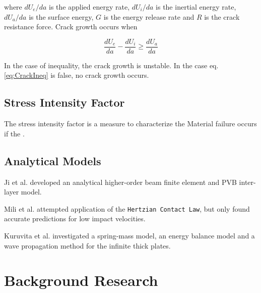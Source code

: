 \documentclass[format=acmsmall, 12pt, screen=true, review=false]{acmart}
\begin{document}
where $dU_e/da$ is the applied energy rate, $dU_i/da$ is the inertial energy rate, $dU_a/da$ is the surface energy,
$G$ is the energy release rate and $R$ is the crack resistance force. Crack growth occurs when

\begin{equation}
    \label{eq:CrackIneq}
    \frac{dU_e}{da}-\frac{dU_i}{da}\geq\frac{dU_a}{da}
\end{equation}

In the case of inequality, the crack growth is unstable. In the case eq. \ref{eq:CrackIneq} is false, no crack growth occurs.

\subsection{Stress Intensity Factor}

The stress intensity factor is a measure to characterize the  
Material failure occurs if the . \cite{And05}

\subsection{Analytical Models}

Ji et al. \cite{Ji98} developed an analytical higher-order beam finite element and PVB inter-layer model.

\bigbreak
Mili et al. \cite{Mil12} attempted application of the \texttt{Hertzian Contact Law}, but only found accurate predictions for low impact velocities.

\bigbreak
Kuruvita et al. \cite{Kur14} investigated a spring-mass model, an energy balance model and a wave propagation method for the infinite thick plates.

\section{Background Research}


\end{document}
